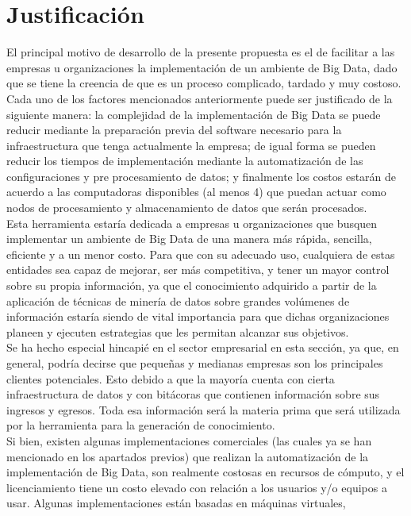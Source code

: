 \section{Justificación}

El principal motivo de desarrollo de la presente propuesta es el de facilitar a las empresas u organizaciones la implementación de
un ambiente de Big Data, dado que se tiene la creencia de que es un proceso complicado, tardado y muy costoso. Cada uno de los
factores mencionados anteriormente puede ser justificado de la siguiente manera: la complejidad de la implementación de Big Data
se puede reducir mediante la preparación previa del software necesario para la infraestructura que tenga actualmente la empresa; de
igual forma se pueden reducir los tiempos de implementación mediante la automatización de las configuraciones y pre
procesamiento de datos; y finalmente los costos estarán de acuerdo a las computadoras disponibles (al menos 4) que puedan actuar
como nodos de procesamiento y almacenamiento de datos que serán procesados.
\\
Esta herramienta estaría dedicada a empresas u organizaciones que busquen implementar un ambiente de Big Data de una manera
más rápida, sencilla, eficiente y a un menor costo. Para que con su adecuado uso, cualquiera de estas entidades sea capaz de
mejorar, ser más competitiva, y tener un mayor control sobre su propia información, ya que el conocimiento adquirido a partir de
la aplicación de técnicas de minería de datos sobre grandes volúmenes de información estaría siendo de vital importancia para que
dichas organizaciones planeen y ejecuten estrategias que les permitan alcanzar sus objetivos.
\\
Se ha hecho especial hincapié en el sector empresarial en esta sección, ya que, en general, podría decirse que pequeñas y medianas
empresas son los principales clientes potenciales. Esto debido a que la mayoría cuenta con cierta infraestructura de datos y con
bitácoras que contienen información sobre sus ingresos y egresos. Toda esa información será la materia prima que será utilizada
por la herramienta para la generación de conocimiento.
\\
Si bien, existen algunas implementaciones comerciales (las cuales ya se han mencionado en los apartados previos) que realizan la
automatización de la implementación de Big Data, son realmente costosas en recursos de cómputo, y el licenciamiento tiene un
costo elevado con relación a los usuarios y/o equipos a usar. Algunas implementaciones están basadas en máquinas virtuales,
